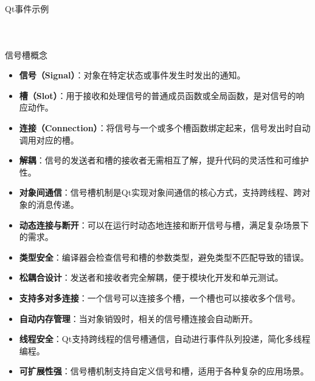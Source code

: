 \documentclass[UTF8,aspectratio=169]{beamer}
\begin{document}
\begin{frame}[fragile]{Qt事件示例}
    \begin{columns}
        \begin{column}{0.48\textwidth}
            \inputminted[firstline=1,lastline=20]{cpp}{code/qt_event_example.cpp}
        \end{column}
        \begin{column}{0.48\textwidth}
            \inputminted[firstline=21,lastline=40]{cpp}{code/qt_event_example.cpp}
        \end{column}
    \end{columns}
\end{frame}

\begin{frame}{信号槽概念}
    \begin{itemize}
        \item \textbf{信号（Signal）}：对象在特定状态或事件发生时发出的通知。
        \item \textbf{槽（Slot）}：用于接收和处理信号的普通成员函数或全局函数，是对信号的响应动作。
        \item \textbf{连接（Connection）}：将信号与一个或多个槽函数绑定起来，信号发出时自动调用对应的槽。
        \item \textbf{解耦}：信号的发送者和槽的接收者无需相互了解，提升代码的灵活性和可维护性。
        \item \textbf{对象间通信}：信号槽机制是Qt实现对象间通信的核心方式，支持跨线程、跨对象的消息传递。
        \item \textbf{动态连接与断开}：可以在运行时动态地连接和断开信号与槽，满足复杂场景下的需求。
        \item \textbf{类型安全}：编译器会检查信号和槽的参数类型，避免类型不匹配导致的错误。
        \item \textbf{松耦合设计}：发送者和接收者完全解耦，便于模块化开发和单元测试。
        \item \textbf{支持多对多连接}：一个信号可以连接多个槽，一个槽也可以接收多个信号。
        \item \textbf{自动内存管理}：当对象销毁时，相关的信号槽连接会自动断开。
        \item \textbf{线程安全}：Qt支持跨线程的信号槽通信，自动进行事件队列投递，简化多线程编程。
        \item \textbf{可扩展性强}：信号槽机制支持自定义信号和槽，适用于各种复杂的应用场景。
    \end{itemize}
\end{frame}
\end{document}
